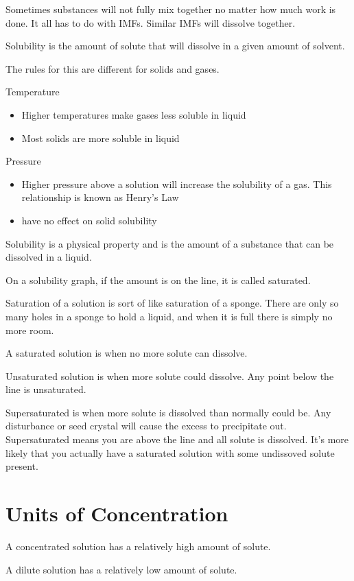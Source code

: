 \documentclass[../hchem.tex]{subfiles}
\begin{document}
Sometimes substances will not fully mix together no matter how much work is done. It all has to do with IMFs. Similar IMFs will dissolve together.

Solubility is the amount of solute that will dissolve in a given amount of solvent.

The rules for this are different for solids and gases.

Temperature
\begin{itemize}
    \item Higher temperatures make gases less soluble in liquid
    \item Most solids are more soluble in liquid 
\end{itemize}

Pressure 
\begin{itemize}
    \item Higher pressure above a solution will increase the solubility of a gas. This relationship is known as Henry's Law 
    \item have no effect on solid solubility
\end{itemize}

Solubility is a physical property and is the amount of a substance that can be dissolved in a liquid.

On a solubility graph, if the amount is on the line, it is called saturated.

Saturation of a solution is sort of like saturation of a sponge. There are only so many holes in a sponge to hold a liquid, and when it is full there is simply no more room.

A saturated solution is when no more solute can dissolve.

Unsaturated solution is when more solute could dissolve. Any point below the line is unsaturated.

Supersaturated is when more solute is dissolved than normally could be. Any disturbance or seed crystal will cause the excess to precipitate out. Supersaturated means 
you are above the line and all solute is dissolved. It's more likely that you actually have a saturated solution with some undissoved solute present.
\section{Units of Concentration}
A concentrated solution has a relatively high amount of solute.

A dilute solution has a relatively low amount of solute.
\end{document}
